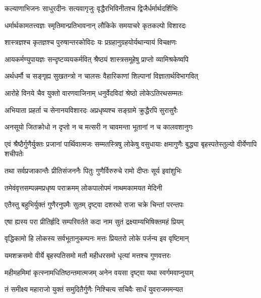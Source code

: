 \twolineshloka
{कल्याणाभिजनः साधुरदीनः सत्यवागृजुः}
{वृद्धैरभिविनीतश्च द्विजैर्धर्मार्थदर्शिभिः} %

\twolineshloka
{धर्मार्थकामतत्त्वज्ञः स्मृतिमान्प्रतिभावनान्}
{लौकिके समयाचरे कृतकल्पो विशारदः} %

\twolineshloka
{शास्त्रज्ञश्च कृतज्ञश्च पुरुषान्तरकोविदः}
{यः प्रग्रहानुग्रहयोर्यथान्यायं विचक्षणः} %

\twolineshloka
{आयकर्मण्युपायज्ञः सन्दृष्टव्ययकर्मवित्}
{श्रैष्ठ्यं शास्त्रसमूहेषु प्राप्तो व्यामिश्रकेष्वपि} %

\twolineshloka
{अर्थधर्मौ च सङ्गृह्य सुखतन्त्रो न चालसः}
{वैहारिकाणां शिल्पानां विज्ञातार्थविभागवित्} %

\twolineshloka
{आरोहे विनये चैव युक्तो वारणवाजिनाम्}
{धनुर्वेदविदां श्रेष्ठो लोकेऽतिरथसम्मतः} %

\twolineshloka
{अभियाता प्रहर्ता च सेनानयविशारदः}
{अप्रधृष्यश्च सङ्ग्रामे क्रुद्धैरपि सुरासुरैः} %

\twolineshloka
{अनसूयो जितक्रोधो न दृप्तो न च मत्सरी}
{न चावमन्ता भूतानां न च कालवशानुगः} %

\threelineshloka
{एवं श्रैष्ठैर्गुणैर्युक्तः प्रजानां पार्थिवात्मजः}
{सम्मतस्त्रिषु लोकेषु वसुधायाः क्षमागुणैः}
{बुद्ध्या बृहस्पतेस्तुल्यो वीर्येणापि शचीपतेः} %

\twolineshloka
{तथा सर्वप्रजाकान्तैः प्रीतिसंजननैः पितुः}
{गुणैर्विरुरुचे रामो दीप्तः सूर्य इवांशुभिः} %

\twolineshloka
{तमेवंवृत्तसम्पन्नमप्रधृष्य पराक्रमम्}
{लोकपालोपमं नाथमकामयत मेदिनी} %

\twolineshloka
{एतैस्तु बहुभिर्युक्तं गुणैरनुपमैः सुतम्}
{दृष्ट्वा दशरथो राजा चक्रे चिन्तां परन्तपः} %

\twolineshloka
{एषा ह्यस्य परा प्रीतिर्हृदि सम्परिवर्तते}
{कदा नाम सुतं द्रक्ष्याम्यभिषिक्तमहं प्रियम्} %

\twolineshloka
{वृद्धिकामो हि लोकस्य सर्वभूतानुकम्पनः}
{मत्तः प्रियतरो लोके पर्जन्य इव वृष्टिमान्} %

\twolineshloka
{यमशक्रसमो वीर्ये बृहस्पतिसमो मतौ}
{महीधरसमो धृत्यां मत्तश्च गुणवत्तरः} %

\twolineshloka
{महीमहमिमां कृत्स्नामधितिष्ठन्तमात्मजम्}
{अनेन वयसा दृष्ट्वा यथा स्वर्गमवाप्नुयाम्} %

\twolineshloka
{तं समीक्ष्य महाराजो युक्तं समुदितैर्गुणैः}
{निश्चित्य सचिवैः सार्धं युवराजममन्यत} %

